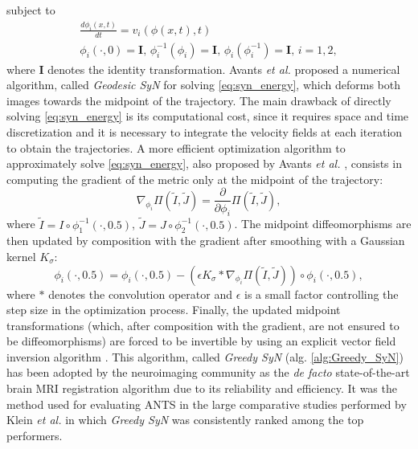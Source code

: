subject to
\begin{equation}\label{eq:syn_energy_constraints}
    \begin{array}{l}
        \frac{d\phi_{i}(x, t)}{dt} = v_{i}(\phi(x,t),t)\\
        \phi_{i}(\cdot, 0) = \mathbf{I},\, \phi_{i}^{-1}(\phi_{i}) = \mathbf{I},\, \phi_{i}(\phi_{i}^{-1}) = \mathbf{I},\, i=1,2,
    \end{array}
\end{equation}
where $\mathbf{I}$ denotes the identity transformation. Avants {\it et al.} \cite{Avants2006} proposed a numerical algorithm, called \textit{Geodesic SyN} for solving \eqref{eq:syn_energy}, which deforms both images towards the midpoint of the trajectory. The main drawback of directly solving \eqref{eq:syn_energy} is its computational cost, since it requires space and time discretization and it is necessary to integrate the velocity fields at each iteration to obtain the trajectories. A more efficient optimization algorithm to approximately solve \eqref{eq:syn_energy}, also proposed by Avants {\it et al.} \cite{Avants2008, Avants2011}, consists in computing the gradient of the metric only at the midpoint of the trajectory:
\begin{equation}\label{eq:grad_metric}
    \nabla_{\phi_{i}} \Pi(\tilde{I}, \tilde{J}) = \frac{\partial}{\partial \phi_{i}} \Pi \left( \tilde{I}, \tilde{J}\right),
\end{equation}
where $\tilde{I} = I \circ \phi_{1}^{-1}(\cdot, 0.5)$, $\tilde{J} = J \circ \phi_{2}^{-1}(\cdot, 0.5)$. The midpoint diffeomorphisms are then updated by composition with the gradient after smoothing with a Gaussian kernel $K_{\sigma}$:
\begin{equation}\label{eq:gsyn_update}
    \phi_{i}(\cdot, 0.5) = \phi_{i}(\cdot, 0.5) - \left( \epsilon K_{\sigma} \ast \nabla_{\phi_{i}} \Pi(\tilde{I}, \tilde{J}) \right) \circ \phi_{i}(\cdot, 0.5),
\end{equation}
where $\ast$ denotes the convolution operator and $\epsilon$ is a small factor controlling the step size in the optimization process. Finally, the updated midpoint transformations (which, after composition with the gradient, are not ensured to be diffeomorphisms) are forced to be invertible by using an explicit vector field inversion algorithm \cite{Chen2008}. This algorithm, called \textit{Greedy SyN} (alg. \ref{alg:Greedy_SyN}) has been adopted by the neuroimaging community as the \textit{de facto} state-of-the-art brain MRI registration algorithm due to its reliability and efficiency. It was the method used for evaluating ANTS \cite{Avants2011} in the large comparative studies performed by Klein {\it et al.} \cite{Klein2009, Klein2010} in which \textit{Greedy SyN} was consistently ranked among the top performers.

